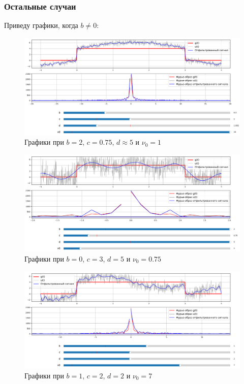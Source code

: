\documentclass[a4paper,12pt]{article}
\begin{document}
\subsubsection{Остальные случаи}

Приведу графики, когда \(b \neq 0\):

\begin{figure}[H]  
    \centering
    \includegraphics[width=1\textwidth]{../images/1.3.1.png}
    \caption{Графики при \(b = 2\), \(c =  0.75\), \(d \approx 5\) и \(\nu_0 = 1\)}  
    \label{fig:my_image}  
\end{figure}


\begin{figure}[H]  
    \centering
    \includegraphics[width=1\textwidth]{../images/1.3.2.png}
    \caption{Графики при \(b = 0\), \(c =  3\), \(d = 5\) и \(\nu_0 = 0.75\)}  
    \label{fig:my_image}  
\end{figure}


\begin{figure}[H]  
    \centering
    \includegraphics[width=1\textwidth]{../images/1.3.3.png}
    \caption{Графики при \(b = 1\), \(c =  2\), \(d = 2\) и \(\nu_0 = 7\)}  
    \label{fig:my_image}  
\end{figure}
\end{document}
